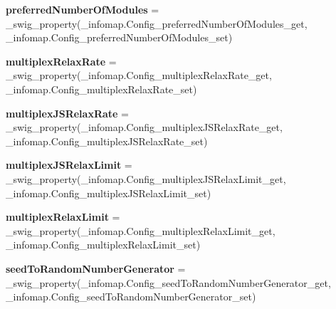 \begin{DoxyCompactItemize}
\item 
\mbox{\label{classdsmacc_1_1graph_1_1infomap_1_1Config_a2a72f57e912e1a8315d7eb25c7f1fe82}} 
{\bfseries preferred\+Number\+Of\+Modules} = \+\_\+swig\+\_\+property(\+\_\+infomap.\+Config\+\_\+preferred\+Number\+Of\+Modules\+\_\+get, \+\_\+infomap.\+Config\+\_\+preferred\+Number\+Of\+Modules\+\_\+set)
\item 
\mbox{\label{classdsmacc_1_1graph_1_1infomap_1_1Config_ab0c51f5ece83a85d095e0d3dd8168dd3}} 
{\bfseries multiplex\+Relax\+Rate} = \+\_\+swig\+\_\+property(\+\_\+infomap.\+Config\+\_\+multiplex\+Relax\+Rate\+\_\+get, \+\_\+infomap.\+Config\+\_\+multiplex\+Relax\+Rate\+\_\+set)
\item 
\mbox{\label{classdsmacc_1_1graph_1_1infomap_1_1Config_a00202cde859b1c3267d4356eb425edcb}} 
{\bfseries multiplex\+J\+S\+Relax\+Rate} = \+\_\+swig\+\_\+property(\+\_\+infomap.\+Config\+\_\+multiplex\+J\+S\+Relax\+Rate\+\_\+get, \+\_\+infomap.\+Config\+\_\+multiplex\+J\+S\+Relax\+Rate\+\_\+set)
\item 
\mbox{\label{classdsmacc_1_1graph_1_1infomap_1_1Config_a9ba15c09a643bcb7adeeda34afc5e7d3}} 
{\bfseries multiplex\+J\+S\+Relax\+Limit} = \+\_\+swig\+\_\+property(\+\_\+infomap.\+Config\+\_\+multiplex\+J\+S\+Relax\+Limit\+\_\+get, \+\_\+infomap.\+Config\+\_\+multiplex\+J\+S\+Relax\+Limit\+\_\+set)
\item 
\mbox{\label{classdsmacc_1_1graph_1_1infomap_1_1Config_a4f355e385716d2eb67a039aca0771c30}} 
{\bfseries multiplex\+Relax\+Limit} = \+\_\+swig\+\_\+property(\+\_\+infomap.\+Config\+\_\+multiplex\+Relax\+Limit\+\_\+get, \+\_\+infomap.\+Config\+\_\+multiplex\+Relax\+Limit\+\_\+set)
\item 
\mbox{\label{classdsmacc_1_1graph_1_1infomap_1_1Config_a00241c8aa53a121373c5d2996c032ad1}} 
{\bfseries seed\+To\+Random\+Number\+Generator} = \+\_\+swig\+\_\+property(\+\_\+infomap.\+Config\+\_\+seed\+To\+Random\+Number\+Generator\+\_\+get, \+\_\+infomap.\+Config\+\_\+seed\+To\+Random\+Number\+Generator\+\_\+set)
\item 

\end{DoxyCompactItemize}
